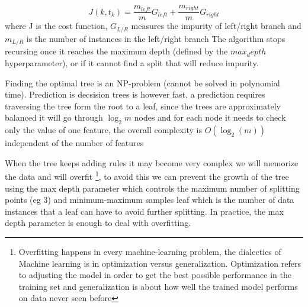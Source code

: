 \documentclass[11pt]{article}
\begin{document}
\begin{equation}\label{eq:cart}
J(k,t_k) = \frac{m_{left}}{m}G_{left} + \frac{m_{right}}{m}G_{right}
\end{equation}
where J is the cost function, $G_{L/R}$ measures the impurity of left/right branch and $m_{L/R}$ is the number of instances in the left/right branch 
The algorithm stops recursing once it reaches the maximum depth (defined by the $max_depth$ hyperparameter), or if it cannot find a split that will reduce impurity. 

Finding the optimal tree is an NP-problem (cannot be solved in polynomial time). Prediction is decsision trees is however fast, a prediction requires traversing the tree form the root to a leaf, since the trees are approximately balanced it will go through $\log_2m$ nodes and for each node it needs to check only the value of one feature, the overall complexity is $O(\log_2(m))$ independent of the number of features

When the tree keeps adding rules it may become very complex we will memorize the data and will overfit \footnote{Overfitting happens in every machine-learning problem, the dialectics of Machine learning is in optimization versus generalization. Optimization refers to adjusting the model in order to get the best possible performance in the training set and generalization is about how well the trained model performs on data never seen before}, to avoid this we can prevent the growth of the tree using the max depth parameter which controls the maximum number of splitting points (eg 3) and minimum-maximum samples leaf which is the number of data instances that a leaf can have to avoid further splitting. In practice, the max depth parameter is enough to deal with overfitting.
\end{document}
